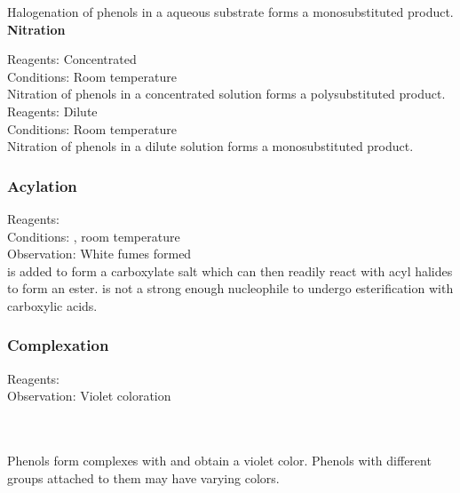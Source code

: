 \documentclass[../main]{subfiles}
\begin{document}
	Halogenation of phenols in a aqueous substrate forms a monosubstituted product. \\

	\noindent \textbf{Nitration}

	Reagents: Concentrated  \\
	Conditions: Room temperature\\

	Nitration of phenols in a concentrated solution forms a polysubstituted product. \\

	Reagents: Dilute  \\
	Conditions: Room temperature\\

	Nitration of phenols in a dilute solution forms a monosubstituted product. \\

	\subsubsection{Acylation}

	Reagents:  \\
	Conditions: , room temperature \\
	Observation: White fumes formed  \\

	 is added to form a carboxylate salt which can then readily react with acyl halides to form an ester.  is not a strong enough nucleophile to undergo esterification with carboxylic acids. \\

	\subsubsection{Complexation}

	Reagents:  \\
	Observation: Violet coloration \\

	 \\
	 \\

	\vspace{12pt}

	Phenols form complexes with  and obtain a violet color. Phenols with different groups attached to them may have varying colors.

	
\end{document}
